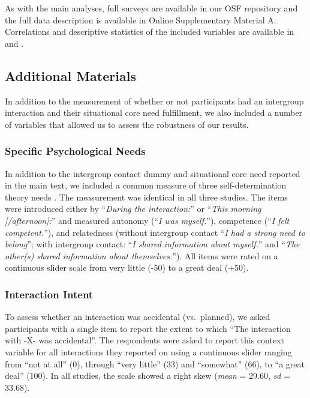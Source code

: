 As with the main analyses, full surveys are available in our OSF
repository \citep{KreienkampMasked2022a} and the full data description
is available in Online Supplementary Material A. Correlations and
descriptive statistics of the included variables are available in
 and .

\subsection{Additional Materials}

In addition to the measurement of whether or not participants had an
intergroup interaction and their situational core need fulfillment, we
also included a number of variables that allowed us to assess the
robustness of our results.

\subsubsection{Specific Psychological Needs}

In addition to the intergroup contact dummy and situational core need
reported in the main text, we included a common measure of three
self-determination theory needs \citep[see][]{Downie2008}. The
measurement was identical in all three studies. The items were
introduced either by ``\textit{During the interaction:}'' or
``\textit{This morning [/afternoon]:}'' and measured autonomy
(``\textit{I was myself.}''), competence
(``\textit{I felt competent.}''), and relatedness (without intergroup
contact ``\textit{I had a strong need to belong}''; with intergroup
contact: ``\textit{I shared information about myself.}'' and
``\textit{The other(s) shared information about themselves.}''). All
items were rated on a continuous slider scale from very little (-50) to
a great deal (+50).

\subsubsection{Interaction Intent}

To assess whether an interaction was accidental (vs.~planned), we asked
participants with a single item to report the extent to which ``The
interaction with -X- was accidental''. The respondents were asked to
report this context variable for all interactions they reported on using
a continuous slider ranging from ``not at all'' (0), through ``very
little'' (33) and ``somewhat'' (66), to ``a great deal'' (100). In all
studies, the scale showed a right skew (\textit{mean} = 29.60,
\textit{sd} = 33.68).

